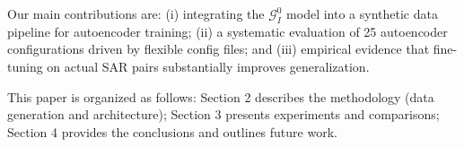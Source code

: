 Our main contributions are: (i) integrating the $\mathcal{G}_I^0$ model into a synthetic data pipeline for autoencoder training; (ii) a systematic evaluation of 25 autoencoder configurations driven by flexible config files; and (iii) empirical evidence that fine-tuning on actual SAR pairs substantially improves generalization.

This paper is organized as follows: Section 2 describes the methodology (data generation and architecture); Section 3 presents experiments and comparisons; Section 4 provides the conclusions and outlines future work.
